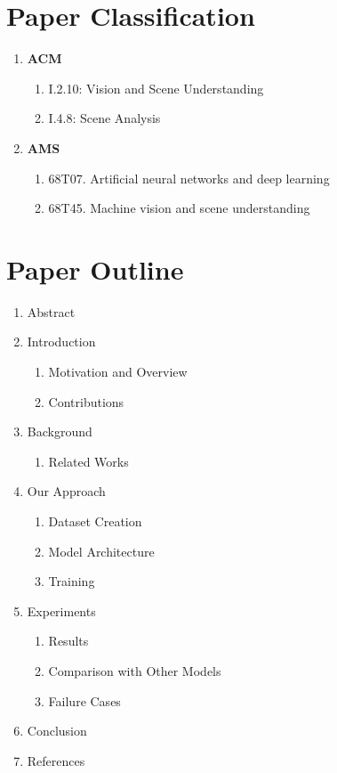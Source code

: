 \documentclass[11pt]{article}
\begin{document}
    \section{Paper Classification}
    \begin{enumerate}
        \item \textbf{ACM}
            \begin{enumerate}
                \item I.2.10:  Vision and Scene Understanding
                \item I.4.8:  Scene Analysis
            \end{enumerate}
        \item \textbf{AMS}
            \begin{enumerate}
                \item 68T07.  Artificial neural networks and deep learning 
                \item 68T45.  Machine vision and scene understanding
            \end{enumerate}
    \end{enumerate}

    \section{Paper Outline}
    \begin{enumerate}
        \item Abstract
        \item Introduction
            \begin{enumerate}
                \item Motivation and Overview
                \item Contributions
            \end{enumerate}
        \item Background
            \begin{enumerate}
                \item Related Works
            \end{enumerate}
        \item Our Approach
            \begin{enumerate}
                \item Dataset Creation
                \item Model Architecture
                \item Training
            \end{enumerate}
        \item Experiments
            \begin{enumerate}
                \item Results
                \item Comparison with Other Models
                \item Failure Cases
            \end{enumerate}
        \item Conclusion
        \item References
    \end{enumerate}


    
    
\end{document}
